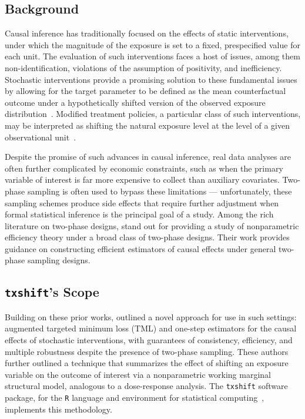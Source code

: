 \subsection{Background}

Causal inference has traditionally focused on the effects of static
interventions, under which the magnitude of the exposure is set to a fixed,
prespecified value for each unit. The evaluation of such interventions faces
a host of issues, among them non-identification, violations of the assumption of
positivity, and inefficiency. Stochastic interventions provide a promising
solution to these fundamental issues by allowing for the target parameter to be
defined as the mean counterfactual outcome under a hypothetically shifted
version of the observed exposure distribution~\citep{diaz2012population}.
Modified treatment policies, a particular class of such interventions, may be
interpreted as shifting the natural exposure level at the level of a given
observational unit~\citep{haneuse2013estimation, diaz2018stochastic}.

Despite the promise of such advances in causal inference, real data analyses are
often further complicated by economic constraints, such as when the primary
variable of interest is far more expensive to collect than auxiliary covariates.
Two-phase sampling is often used to bypass these limitations --- unfortunately,
these sampling schemes produce side effects that require further adjustment when
formal statistical inference is the principal goal of a study. Among the rich
literature on two-phase designs, \citet{rose2011targeted2sd} stand out for
providing a study of nonparametric efficiency theory under a broad class of
two-phase designs. Their work provides guidance on constructing efficient
estimators of causal effects under general two-phase sampling designs.

\subsection{\texttt{txshift}'s Scope}

Building on these prior works, \citet{hejazi2020efficient} outlined a novel
approach for use in such settings: augmented targeted minimum loss (TML) and
one-step estimators for the causal effects of stochastic interventions, with
guarantees of consistency, efficiency, and multiple robustness despite the
presence of two-phase sampling. These authors further outlined a technique that
summarizes the effect of shifting an exposure variable on the outcome of
interest via a nonparametric working marginal structural model, analogous to
a dose-response analysis. The \texttt{txshift} software package, for the
\texttt{R} language and environment for statistical computing~\citep{R},
implements this methodology.

